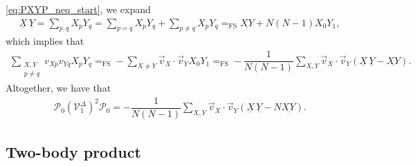 \documentclass[nofootinbib,notitlepage,11pt]{revtex4-2}
\newcommand{\f}[2]{\dfrac{#1}{#2}} %
\newcommand{\p}[1]{\left(#1\right)} %
\renewcommand{\c}{\cdot} %
\renewcommand{\v}{\vec} %
\newcommand{\1}{\mathds{1}}
\renewcommand{\P}{\mathcal{P}}
\newcommand{\V}{\mathcal{V}}
\newcommand{\EQFS}{=_{\text{FS}}}
\newcommand{\col}{\underline}
\begin{document}
\eqref{eq:PXYP_neq_start}, we expand
\begin{align}
  \col{X}\,\col{Y} = \sum_{p,q} X_p Y_q
  = \sum_{p=q} X_p Y_q + \sum_{p\ne q} X_p Y_q
  \EQFS \col{XY} + N\p{N-1} X_0 Y_1,
  \label{eq:PXYP_neq_ops}
\end{align}
which implies that
\begin{align}
  \sum_{\substack{X,Y\\p\ne q}} v_{Xp} v_{Yq} X_p Y_q
  \EQFS - \sum_{X\ne Y} \v v_X\c\v v_Y X_0 Y_1
  \EQFS - \f1{N\p{N-1}}\sum_{X,Y} \v v_X\c\v v_Y
  \p{\col{X}\,\col{Y} - \col{XY}}.
  \label{eq:PXYP_neq}
\end{align}
Altogether, we have that
\begin{align}
  \P_0 \p{\V_1^\Delta}^2 \P_0
  = - \f1{N\p{N-1}} \sum_{X,Y} \v v_X \c\v v_Y
  \p{\col{X}\,\col{Y} - N \col{XY}}.
\end{align}

\subsection{Two-body product}
\label{sec:POQP}
\end{document}

